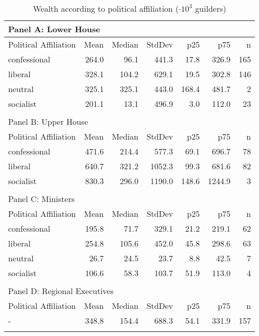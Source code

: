 \begin{table}[ht]
\centering
\begin{tabular}{lrrrrrr}
   
\multicolumn{7}{l}{Panel A: Lower House}\\ 
\hline
Political Affiliation & Mean & Median & StdDev & p25 & p75 & n \\\hline

confessional & 264.0 & 96.1 & 441.3 & 17.8 & 326.9 & 165 \\ 
  liberal & 328.1 & 104.2 & 629.1 & 19.5 & 302.8 & 146 \\ 
  neutral & 325.1 & 325.1 & 443.0 & 168.4 & 481.7 & 2 \\ 
  socialist & 201.1 & 13.1 & 496.9 & 3.0 & 112.0 & 23 \\ 
   \hline\\ 
\multicolumn{7}{l}{Panel B: Upper House}\\ 
\hline
Political Affiliation & Mean & Median & StdDev & p25 & p75 & n \\\hline
confessional & 471.6 & 214.4 & 577.3 & 69.1 & 696.7 & 78 \\ 
  liberal & 640.7 & 321.2 & 1052.3 & 99.3 & 681.6 & 82 \\ 
  socialist & 830.3 & 296.0 & 1190.0 & 148.6 & 1244.9 & 3 \\ 
   \hline\\ 
\multicolumn{7}{l}{Panel C: Ministers}\\ 
\hline
Political Affiliation & Mean & Median & StdDev & p25 & p75 & n \\\hline
confessional & 195.8 & 71.7 & 329.1 & 21.2 & 219.1 & 62 \\ 
  liberal & 254.8 & 105.6 & 452.0 & 45.8 & 298.6 & 63 \\ 
  neutral & 26.7 & 24.5 & 23.7 & 8.8 & 42.5 & 7 \\ 
  socialist & 106.6 & 58.3 & 103.7 & 51.9 & 113.0 & 4 \\ 
   \hline\\ 
\multicolumn{7}{l}{Panel D: Regional Executives}\\ 
\hline
Political Affiliation & Mean & Median & StdDev & p25 & p75 & n \\\hline
- & 348.8 & 154.4 & 688.3 & 54.1 & 331.9 & 157 \\ 
   \hline
\multicolumn{7}{l}{}\\
\end{tabular}
\caption{Wealth according to political affiliation ($\cdot 10^{3}$ guilders)} 
\label{tab:wealthfunction}
\end{table}
